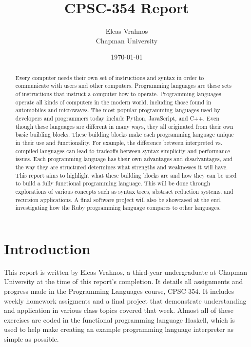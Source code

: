\documentclass{article}
\title{CPSC-354 Report}
\author{Eleas Vrahnos  \\ Chapman University}
\date{\today}
\theoremstyle{theorem}
\theoremstyle{definition}
\theoremstyle{remark}
\begin{document}
\maketitle

\begin{abstract}
\noindent Every computer needs their own set of instructions and syntax in order to communicate with users and other computers. Programming languages are these sets of instructions that instruct a computer how to operate. Programming languages operate all kinds of computers in the modern world, including those found in automobiles and microwaves. The most popular programming languages used by developers and programmers today include Python, JavaScript, and C++. Even though these languages are different in many ways, they all originated from their own basic building blocks. These building blocks make each programming language unique in their use and functionality. For example, the difference between interpreted vs. compiled languages can lead to tradeoffs between syntax simplicity and performance issues. Each programming language has their own advantages and disadvantages, and the way they are structured determines what strengths and weaknesses it will have. This report aims to highlight what these building blocks are and how they can be used to build a fully functional programming language. This will be done through explorations of various concepts such as syntax trees, abstract reduction systems, and recursion applications. A final software project will also be showcased at the end, investigating how the Ruby programming language compares to other languages.
\end{abstract}

\tableofcontents

\section{Introduction}\label{intro}

This report is written by Eleas Vrahnos, a third-year undergraduate at Chapman University at the time of this report's completion. It details all assignments and progress made in the Programming Languages course, CPSC 354. It includes weekly homework assigments and a final project that demonstrate understanding and application in various class topics covered that week. Almost all of these exercises are coded in the functional programming language Haskell, which is used to help make creating an example programming language interpreter as simple as possible.
\newpage
\end{document}

